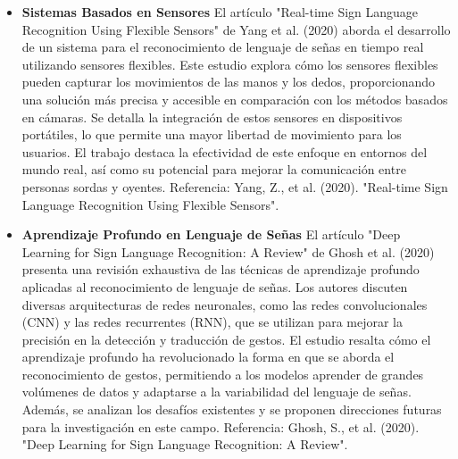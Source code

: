 \begin{itemize}
\item \textbf{Sistemas Basados en Sensores} \newline 
El artículo "Real-time Sign Language Recognition Using Flexible Sensors" de Yang et al. (2020) aborda el desarrollo de un sistema para el reconocimiento de lenguaje de señas en tiempo real utilizando sensores flexibles. Este estudio explora cómo los sensores flexibles pueden capturar los movimientos de las manos y los dedos, proporcionando una solución más precisa y accesible en comparación con los métodos basados en cámaras. Se detalla la integración de estos sensores en dispositivos portátiles, lo que permite una mayor libertad de movimiento para los usuarios. El trabajo destaca la efectividad de este enfoque en entornos del mundo real, así como su potencial para mejorar la comunicación entre personas sordas y oyentes. \newline 
Referencia: Yang, Z., et al. (2020). "Real-time Sign Language Recognition Using Flexible Sensors". \cite{mdpi_sensors_19_2295}


\item \textbf{Aprendizaje Profundo en Lenguaje de Señas} \newline 
El artículo "Deep Learning for Sign Language Recognition: A Review" de Ghosh et al. (2020) presenta una revisión exhaustiva de las técnicas de aprendizaje profundo aplicadas al reconocimiento de lenguaje de señas. Los autores discuten diversas arquitecturas de redes neuronales, como las redes convolucionales (CNN) y las redes recurrentes (RNN), que se utilizan para mejorar la precisión en la detección y traducción de gestos. El estudio resalta cómo el aprendizaje profundo ha revolucionado la forma en que se aborda el reconocimiento de gestos, permitiendo a los modelos aprender de grandes volúmenes de datos y adaptarse a la variabilidad del lenguaje de señas. Además, se analizan los desafíos existentes y se proponen direcciones futuras para la investigación en este campo.  \newline 
Referencia: Ghosh, S., et al. (2020). "Deep Learning for Sign Language Recognition: A Review". \cite{mdpi_applied_sci_10_2458}


\end{itemize}
